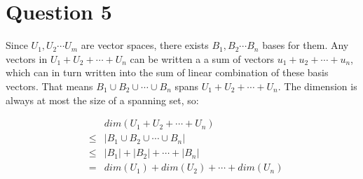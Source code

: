 \section*{Question 5}
Since $ U_1, U_2 \cdots U_m $ are vector spaces, there exists $ B_1, B_2 \cdots B_n $ bases for them. Any vectors in $ U_1 + U_2 + \cdots + U_n $ can be written a a sum of vectors $ u_1 + u_2 + \cdots + u_n $, which can in turn written into the sum of linear combination of these basis vectors. That means $ B_1 \cup B_2 \cup \cdots \cup B_n $ spans $ U_1 + U_2 + \cdots + U_n $. The dimension is always at most the size of a spanning set, so:

\begin{eqnarray*}
    &   & dim(U_1 + U_2 + \cdots + U_n) \\
    &\le& | B_1 \cup B_2 \cup \cdots \cup B_n | \\
    &\le& | B_1 | + | B_2 | + \cdots + | B_n | \\
    &=  & dim(U_1) + dim(U_2) + \cdots + dim(U_n)
  \end{eqnarray*}